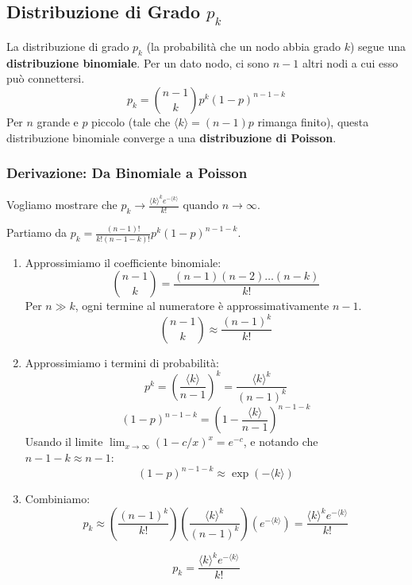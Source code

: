 \subsection{Distribuzione di Grado $p_k$}
La distribuzione di grado $p_k$ (la probabilità che un nodo abbia grado $k$) segue una \textbf{distribuzione binomiale}. Per un dato nodo, ci sono $n-1$ altri nodi a cui esso può connettersi.
\begin{equation}
p_k = \binom{n-1}{k} p^k (1-p)^{n-1-k}
\end{equation}
Per $n$ grande e $p$ piccolo (tale che $\langle k \rangle = (n-1)p$ rimanga finito), questa distribuzione binomiale converge a una \textbf{distribuzione di Poisson}.



\subsubsection{Derivazione: Da Binomiale a Poisson}
Vogliamo mostrare che $p_k \to \frac{\langle k \rangle^k e^{-\langle k \rangle}}{k!}$ quando $n \to \infty$.

\noindent Partiamo da $p_k = \frac{(n-1)!}{k!(n-1-k)!} p^k (1-p)^{n-1-k}$.

\begin{enumerate}
    \item Approssimiamo il coefficiente binomiale:
$$ \binom{n-1}{k} = \frac{(n-1)(n-2)\dots(n-k)}{k!} $$
Per $n \gg k$, ogni termine al numeratore è approssimativamente $n-1$.
$$ \binom{n-1}{k} \approx \frac{(n-1)^k}{k!} $$
\item Approssimiamo i termini di probabilità:
$$ p^k = \left( \frac{\langle k \rangle}{n-1} \right)^k = \frac{\langle k \rangle^k}{(n-1)^k} $$
$$ (1-p)^{n-1-k} = \left( 1 - \frac{\langle k \rangle}{n-1} \right)^{n-1-k} $$
Usando il limite $\lim_{x\to\infty} (1 - c/x)^x = e^{-c}$, e notando che $n-1-k \approx n-1$:
$$ (1-p)^{n-1-k} \approx \exp\left(-\langle k \rangle\right) $$
\item Combiniamo:
$$ p_k \approx \left( \frac{(n-1)^k}{k!} \right) \left( \frac{\langle k \rangle^k}{(n-1)^k} \right) \left( e^{-\langle k \rangle} \right) = \frac{\langle k \rangle^k e^{-\langle k \rangle}}{k!} $$
\end{enumerate}
 


\begin{tcolorbox}[colback=colorB!25,colframe=colorB!75!colorA,title={Distribuzione di Grado di G(n,p)}]
\begin{equation} \label{eq:poisson}
p_k = \frac{\langle k \rangle^k e^{-\langle k \rangle}}{k!}
\end{equation}
\end{tcolorbox}

